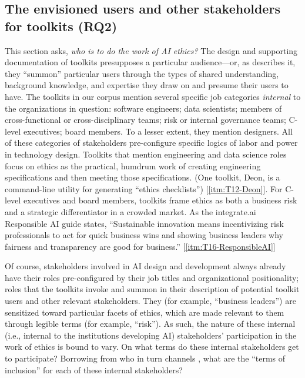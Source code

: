 \documentclass[acmsmall]{acmart}
\begin{document}
\subsection{The envisioned users and other stakeholders for toolkits (RQ2)}
\label{stakeholders}

This section asks, \textit{who is to do the work of AI ethics?} The design and supporting documentation of toolkits presupposes a particular audience---or, as \citet{mattern_2021} describes it, they ``summon'' particular users through the types of shared understanding, background knowledge, and expertise they draw on and presume their users to have.
The toolkits in our corpus mention several specific job categories \textit{internal} to the organizations in question: software engineers; data scientists; members of cross-functional or cross-disciplinary teams; risk or internal governance teams; C-level executives; board members. To a lesser extent, they mention designers. All of these categories of stakeholders pre-configure specific logics of labor and power in technology design. Toolkits that mention engineering and data science roles focus on ethics as the practical, humdrum work of creating engineering specifications and then meeting those specifications. (One toolkit, Deon, is a command-line utility for generating ``ethics checklists'') [\ref{itm:T12-Deon}]. %
For C-level executives and board members, toolkits frame ethics as both a business risk and a strategic differentiator in a crowded market. As the integrate.ai Responsible AI guide states,
``Sustainable innovation means incentivizing risk professionals to act for quick business wins and showing business leaders why fairness and transparency are good for business.'' [\ref{itm:T16-ResponsibleAI}]


Of course, stakeholders involved in AI design and development always already have their roles pre-configured by their job titles and organizational positionality; roles that the toolkits invoke and summon in their description of potential toolkit users and other relevant stakeholders. They (for example, ``business leaders'') are sensitized toward particular facets of ethics, which are made relevant to them through legible terms (for example, ``risk'').
As such, the nature of these internal (i.e., internal to the institutions developing AI) stakeholders' participation in the work of ethics is bound to vary. On what terms do these internal stakeholders get to participate? Borrowing from \citet{Hoffmann2020terms} who in turn channels \citet{ahmed2012being}, what are the ``terms of inclusion'' for each of these internal stakeholders? 
\end{document}
